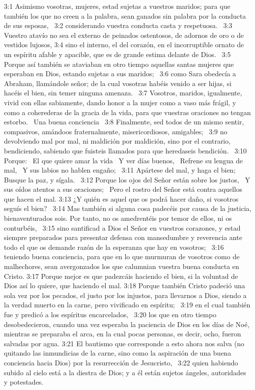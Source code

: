 3:1 Asimismo vosotras, mujeres, estad sujetas a vuestros maridos; para que también los que no creen a la palabra, sean ganados sin palabra por la conducta de sus esposas,  
3:2 considerando vuestra conducta casta y respetuosa.  
3:3 Vuestro atavío no sea el externo de peinados ostentosos, de adornos de oro o de vestidos lujosos, 
3:4 sino el interno, el del corazón, en el incorruptible ornato de un espíritu afable y apacible, que es de grande estima delante de Dios.  
3:5 Porque así también se ataviaban en otro tiempo aquellas santas mujeres que esperaban en Dios, estando sujetas a sus maridos;  
3:6 como Sara obedecía a Abraham, llamándole señor; de la cual vosotras habéis venido a ser hijas, si hacéis el bien, sin temer ninguna amenaza.  
3:7 Vosotros, maridos, igualmente, vivid con ellas sabiamente, dando honor a la mujer como a vaso más frágil, y como a coherederas de la gracia de la vida, para que vuestras oraciones no tengan estorbo.  
Una buena conciencia  
3:8 Finalmente, sed todos de un mismo sentir, compasivos, amándoos fraternalmente, misericordiosos, amigables;  
3:9 no devolviendo mal por mal, ni maldición por maldición, sino por el contrario, bendiciendo, sabiendo que fuisteis llamados para que heredaseis bendición.  
3:10 Porque:  
El que quiere amar la vida  
Y ver días buenos,  
Refrene su lengua de mal,  
Y sus labios no hablen engaño;  
3:11 Apártese del mal, y haga el bien;  
Busque la paz, y sígala.  
3:12 Porque los ojos del Señor están sobre los justos,  
Y sus oídos atentos a sus oraciones;  
Pero el rostro del Señor está contra aquellos que hacen el mal. 
3:13 ¿Y quién es aquel que os podrá hacer daño, si vosotros seguís el bien?  
3:14 Mas también si alguna cosa padecéis por causa de la justicia, bienaventurados sois. Por tanto, no os amedrentéis por temor de ellos, ni os conturbéis,  
3:15 sino santificad a Dios el Señor en vuestros corazones, y estad siempre preparados para presentar defensa con mansedumbre y reverencia ante todo el que os demande razón de la esperanza que hay en vosotros;  
3:16 teniendo buena conciencia, para que en lo que murmuran de vosotros como de malhechores, sean avergonzados los que calumnian vuestra buena conducta en Cristo. 
3:17 Porque mejor es que padezcáis haciendo el bien, si la voluntad de Dios así lo quiere, que haciendo el mal. 
3:18 Porque también Cristo padeció una sola vez por los pecados, el justo por los injustos, para llevarnos a Dios, siendo a la verdad muerto en la carne, pero vivificado en espíritu;  
3:19 en el cual también fue y predicó a los espíritus encarcelados,  
3:20 los que en otro tiempo desobedecieron, cuando una vez esperaba la paciencia de Dios en los días de Noé, mientras se preparaba el arca, en la cual pocas personas, es decir, ocho, fueron salvadas por agua. 
3:21 El bautismo que corresponde a esto ahora nos salva (no quitando las inmundicias de la carne, sino como la aspiración de una buena conciencia hacia Dios) por la resurrección de Jesucristo,  
3:22 quien habiendo subido al cielo está a la diestra de Dios; y a él están sujetos ángeles, autoridades y potestades.  
